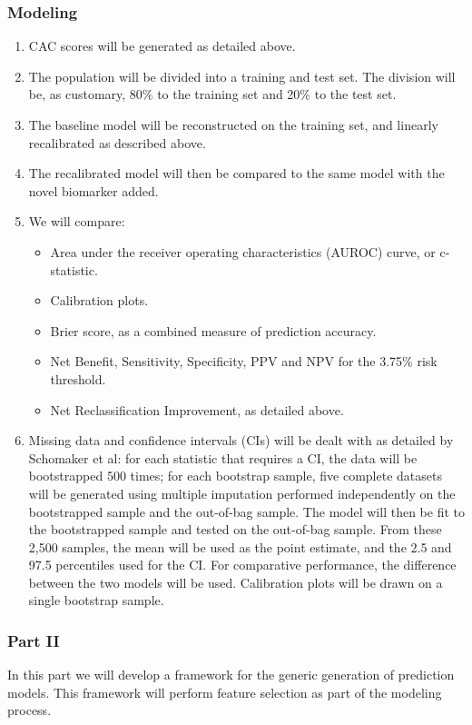 \documentclass[a4paper,12pt]{article}
\begin{document}
		\subsubsection*{Modeling}
		\begin{enumerate}
			\item CAC scores will be generated as detailed above.
			\item The population will be divided into a training and test set. The division will be, as customary, 80\% to the training set and 20\% to the test set.
			\item The baseline model will be reconstructed on the training set, and linearly recalibrated as described above.
			\item The recalibrated model will then be compared to the same model with the novel biomarker added.
			\item We will compare:
			\begin{itemize}
				\item Area under the receiver operating characteristics (AUROC) curve, or c-statistic.
				\item Calibration plots.
				\item Brier score, as a combined measure of prediction accuracy.
				\item Net Benefit, Sensitivity, Specificity, PPV and NPV for the 3.75\% risk threshold.
				\item Net Reclassification Improvement, as detailed above.
			\end{itemize}
			\item Missing data and confidence intervals (CIs) will be dealt with as detailed by Schomaker et al\cite{Schomaker2016}: for each statistic that requires a CI, the data will be bootstrapped 500 times; for each bootstrap sample, five complete datasets will be generated using multiple imputation performed independently on the bootstrapped sample and the out-of-bag sample. The model will then be fit to the bootstrapped sample and tested on the out-of-bag sample. From these 2,500 samples, the mean will be used as the point estimate, and the 2.5 and 97.5 percentiles used for the CI. For comparative performance, the difference between the two models will be used. Calibration plots will be drawn on a single bootstrap sample.
		\end{enumerate}
	
		\subsubsection{Part II}
		In this part we will develop a framework for the generic generation of prediction models. This framework will perform feature selection as part of the modeling process.
		
\end{document}

